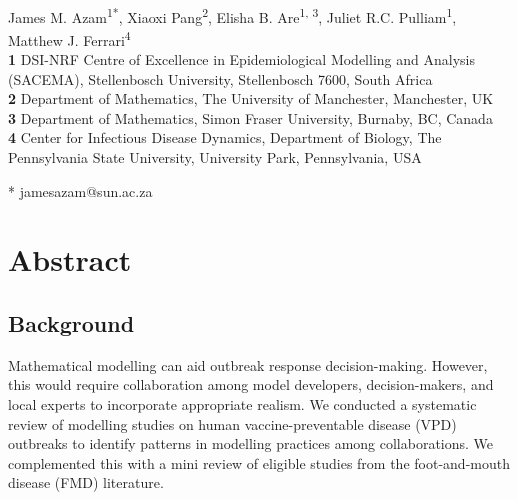\documentclass[10pt,letterpaper]{article}
\providecommand{\DIFaddbegin}{} %
\providecommand{\DIFaddend}{} %
\providecommand{\DIFdelbegin}{} %
\providecommand{\DIFdelend}{} %
\newcommand{\DIFscaledelfig}{0.5}
\newlength{\DIFdelgraphicswidth} %
\newlength{\DIFdelgraphicsheight} %
\newcommand{\DIFaddincludegraphics}[2][]{{\color{blue}\fbox{\DIFOincludegraphics[#1]{#2}}}} %
\newcommand{\DIFdelincludegraphics}[2][]{%
\sbox{\DIFdelgraphicsbox}{\DIFOincludegraphics[#1]{#2}}%
\settoboxwidth{\DIFdelgraphicswidth}{\DIFdelgraphicsbox} %
\settoboxtotalheight{\DIFdelgraphicsheight}{\DIFdelgraphicsbox} %
\scalebox{\DIFscaledelfig}{%
\parbox[b]{\DIFdelgraphicswidth}{\usebox{\DIFdelgraphicsbox}\\[-\baselineskip] \rule{\DIFdelgraphicswidth}{0em}}\llap{\resizebox{\DIFdelgraphicswidth}{\DIFdelgraphicsheight}{%
\setlength{\unitlength}{\DIFdelgraphicswidth}%
\begin{picture}(1,1)%
\thicklines\linethickness{2pt} %
{\color[rgb]{1,0,0}\put(0,0){\framebox(1,1){}}}%
{\color[rgb]{1,0,0}\put(0,0){\line( 1,1){1}}}%
{\color[rgb]{1,0,0}\put(0,1){\line(1,-1){1}}}%
\end{picture}%
}\hspace*{3pt}}} %
} %
\DeclareRobustCommand{\DIFaddbegin}{\DIFOaddbegin \let\includegraphics\DIFaddincludegraphics} %
\DeclareRobustCommand{\DIFaddend}{\DIFOaddend \let\includegraphics\DIFOincludegraphics} %
\DeclareRobustCommand{\DIFdelbegin}{\DIFOdelbegin \let\includegraphics\DIFdelincludegraphics} %
\DeclareRobustCommand{\DIFdelend}{\DIFOaddend \let\includegraphics\DIFOincludegraphics} %
\begin{document}
\vspace*{0.2in}

\begin{flushleft}
{\Large
\textbf\DIFdelbegin %
\DIFdelend \DIFaddbegin {}
\DIFaddend }
\newline
\\
James M. Azam\textsuperscript{1*},
Xiaoxi Pang\textsuperscript{2},
Elisha B. Are\textsuperscript{1, 3},
Juliet R.C. Pulliam\textsuperscript{1},
Matthew J. Ferrari\textsuperscript{4}
\\
\bigskip
\textbf{1} DSI-NRF Centre of Excellence in Epidemiological Modelling and Analysis (SACEMA), Stellenbosch University, Stellenbosch 7600, South Africa
\\
\textbf{2} Department of Mathematics, The University of Manchester, Manchester, UK
\\
\textbf{3} Department of Mathematics, Simon Fraser University, Burnaby, BC, Canada
\\
\textbf{4} Center for Infectious Disease Dynamics, Department of Biology, The Pennsylvania
State University, University Park, Pennsylvania, USA
\\
\bigskip

* jamesazam@sun.ac.za

\end{flushleft}
\section*{Abstract}
\subsection*{Background}
Mathematical modelling can aid outbreak response decision-making. However, this would require collaboration among model developers, decision-makers, and local experts to incorporate appropriate realism. We conducted a systematic review of modelling studies on human vaccine-preventable disease (VPD) outbreaks to identify patterns in modelling practices among collaborations. We complemented this with a mini review of eligible studies from the foot-and-mouth disease (FMD) literature.   
\end{document}
